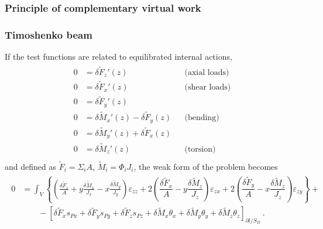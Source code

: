 \documentclass[letterpaper,10pt,english]{jupyterBook}
\begin{document}
\subsubsection{Principle of complementary virtual work}
\label{\detokenize{ch/solids/small-displacements-statics-beams-weak-form:principle-of-complementary-virtual-work}}\label{\detokenize{ch/solids/small-displacements-statics-beams-weak-form:solid-mechanics-intro-small-displacements-statics-beam-weak-form-weak-pcvw}}\subsubsection*{Timoshenko beam}

\sphinxAtStartPar
If the test functions are related to equilibrated internal actions,
\begin{equation*}
\begin{split}\begin{aligned}
  0 & = \delta \widetilde{F}_z'(z)                              && \text{(axial loads)} \\
  0 & = \delta \widetilde{F}_x'(z)                              && \text{(shear loads)} \\
  0 & = \delta \widetilde{F}_y'(z)                              &&                      \\
  0 & = \delta \widetilde{M}_x'(z) - \delta \widetilde{F}_y(z)  && \text{(bending)}     \\
  0 & = \delta \widetilde{M}_y'(z) + \delta \widetilde{F}_x(z)  &&                      \\
  0 & = \delta \widetilde{M}_z'(z)                              && \text{(torsion)}     \\
\end{aligned}\end{split}
\end{equation*}
\sphinxAtStartPar
and defined as \(\widetilde{F}_i = \Sigma_i A\), \(\widetilde{M}_i = \Phi_i J_i\), the weak form of the problem becomes
\begin{equation*}
\begin{split}\begin{aligned}
 0 
 & = \int_V \left\{ \left( \frac{\delta \widetilde{F}_z}{A} + y \frac{\delta \widetilde{M}_x}{J_x} - x \frac{\delta \widetilde{M}_y}{J_y} \right) \varepsilon_{zz} + 2 \left( \dfrac{\delta \widetilde{F}_x}{A} - y \dfrac{\delta \widetilde{M}_z}{J_z} \right) \varepsilon_{zx} + 2 \left( \dfrac{\delta \widetilde{F}_y}{A} - x \dfrac{\delta \widetilde{M}_z}{J_z} \right) \varepsilon_{zy} \right\} + \\
 & \qquad - \left[ \delta \widetilde{F}_x s_{Px} + \delta \widetilde{F}_y s_{Py} + \delta \widetilde{F}_z s_{Pz} + \delta \widetilde{M}_x \theta_x + \delta \widetilde{M}_y \theta_y + \delta \widetilde{M}_z \theta_z \right]_{\partial l / S_D} \ .
\end{aligned}\end{split}
\end{equation*}
\end{document}
